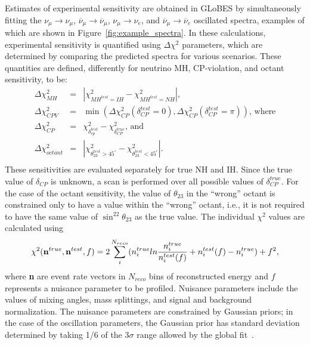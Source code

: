 \documentclass[letterpaper,11pt]{article}
\begin{document}
Estimates of experimental sensitivity are obtained in GLoBES
by simultaneously fitting the $\nu_\mu \rightarrow \nu_\mu$,
$\overline{\nu}_\mu \rightarrow \overline{\nu}_\mu$, $\nu_\mu \rightarrow \nu_e$, 
and  $\overline{\nu}_\mu \rightarrow \overline{\nu}_e$ oscillated spectra, examples of
which are shown in Figure~\ref{fig:example_spectra}.
In these calculations, experimental sensitivity is
quantified using $\Delta\chi^2$ parameters, which are determined
by comparing the predicted spectra for various scenarios. 
These quantities are defined, differently for neutrino MH, CP-violation, and octant 
sensitivity, to be:
\begin{eqnarray}
\Delta\chi^2_{MH} & = & |\chi^2_{MH^{test}=IH} - \chi^2_{MH^{test}=NH}|, \\
\Delta\chi^2_{CPV} & = & \min\left(\Delta\chi^2_{CP}(\delta_{CP}^{test}=0),\Delta\chi^2_{CP}(\delta_{CP}^{test}=\pi)\right)\mbox{, where} \\
\Delta\chi^2_{CP} & = & \chi^2_{\delta_{cp}^{test}} - \chi^2_{\delta_{CP}^{true}}\mbox{, and} \\
\Delta\chi^2_{octant} & = & |\chi^2_{\theta_{23}^{test}>45^\circ} - \chi^2_{\theta_{23}^{test}<45^\circ}|. \\ \nonumber
\end{eqnarray}
These sensitivities are evaluated separately for true NH and IH. 
Since the true value of $\delta_{CP}$ is unknown, a scan is  performed over
all possible values of $\delta_{CP}^{true}$. For the case of the octant sensitivity,
the value of $\theta_{23}$ in the ``wrong'' octant is constrained only to have a value 
within the ``wrong'' octant, i.e., it is not required to have the same value of 
$\sin^22\theta_{23}$ as the true value.
The individual $\chi^2$ values are calculated using
\begin{equation}
\chi^2({\bf n}^{true},{\bf n}^{test},f) = 2 \sum_{i}^{N_{reco}} (n_i^{true} ln\frac{n_i^{true}}{n_i^{test}(f)} + n_i^{test}(f) - n_i^{true}) + f^2,
\label{eq:globes_chisq}
\end{equation}
where {\bf n} are event rate vectors in $N_{reco}$ bins of reconstructed energy and $f$ represents
a nuisance parameter 
to be profiled. Nuisance parameters include the values of mixing angles, 
mass splittings, and signal and
background normalization. The nuisance parameters are constrained by Gaussian priors; 
in the
case of the oscillation parameters, the Gaussian prior has standard deviation
determined by taking 1/6 of the 3$\sigma$ range allowed by the global 
fit~\cite{Fogli:2012ua}. 
\end{document}

